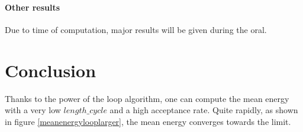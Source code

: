 \documentclass[a4paper,12pt,twoside]{article}
\begin{document}
	\paragraph{Other results}
	Due to time of computation, major results will be given during the oral.
	\newline
	
	\newpage
	\section{Conclusion}
	Thanks to the power of the loop algorithm, one can compute the mean energy with a very low $length\_cycle$ and a high acceptance rate. Quite rapidly, as shown in figure \ref{meanenergylooplarger}, the mean energy converges towards the limit. 
	
	
\end{document}
